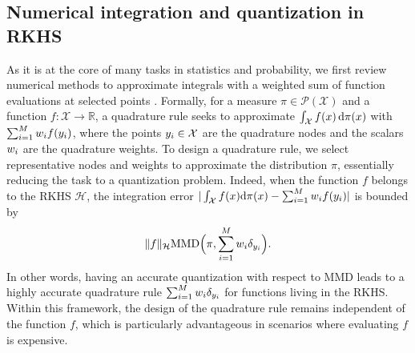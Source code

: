 \subsection{Numerical integration and quantization in RKHS}\label{sec:num_int_quantization_review}


 As it is at the core of many tasks in statistics and probability, we first review numerical methods to approximate integrals with a weighted sum of function evaluations at selected points \cite{RoCaCa99}.
Formally, for a measure $\pi \in \mathcal{P}(\mathcal{X})$ and a function $f: \mathcal{X} \to \mathbb{R}$, a quadrature rule seeks to approximate $\int_{\mathcal{X}} f(x)\,\mathrm{d}\pi(x)$ with $\sum_{i = 1}^{M} w_{i} f(y_{i})$, where the points $y_{i} \in \mathcal{X}$ are the quadrature nodes and the scalars $w_{i}$ are the quadrature weights. To design a quadrature rule, we select representative nodes and weights to approximate the distribution $\pi$, essentially reducing the task to a quantization problem. Indeed, when the function $f$ belongs to the RKHS $\mathcal{H}$, the integration error $|\int_{\mathcal{X}}f(x) \mathrm{d}\pi(x) - \sum_{i = 1}^{M} w_{i} f(y_{i}) |$ is bounded by \cite{MuFuSrSc17} 
\begin{equation}\label{eq:quadrature_mmd_inequality}
     \|f\|_{\mathcal{H}} \mathrm{MMD}\Big(\pi, \sum\limits_{i=1}^M w_{i} \delta_{y_{i}}\Big).
\end{equation}
In other words, having an accurate quantization with respect to MMD leads to a highly accurate quadrature rule $\sum_{i =1}^{M} w_{i} \delta_{y_{i}}$ for functions living in the RKHS. Within this framework, the design of the quadrature rule remains independent of the function $f$, which is particularly advantageous in scenarios where evaluating $f$ is expensive. 



